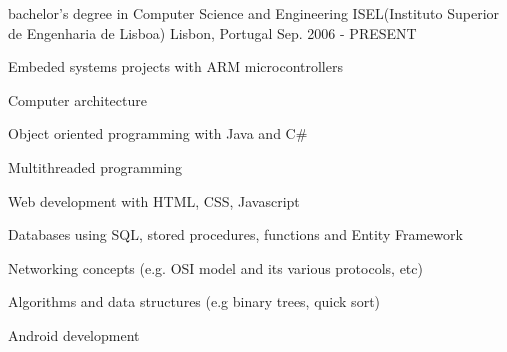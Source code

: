 


\begin{cventries}


\cventry
{bachelor's degree in Computer Science and Engineering} %
{ISEL(Instituto Superior de Engenharia de Lisboa)} %
{Lisbon, Portugal} %
{Sep. 2006 - PRESENT} %
{ %
\begin{cvitems}
\item {Embeded systems projects with ARM microcontrollers}
\item {Computer architecture}
\item {Object oriented programming with Java and C\#}
\item {Multithreaded programming}
\item {Web development with HTML, CSS, Javascript}
\item {Databases using SQL, stored procedures, functions and Entity Framework}
\item {Networking concepts (e.g. OSI model and its various protocols, etc)}
\item {Algorithms and data structures (e.g binary trees, quick sort)}
\item {Android development}
\end{cvitems}
}


\end{cventries}